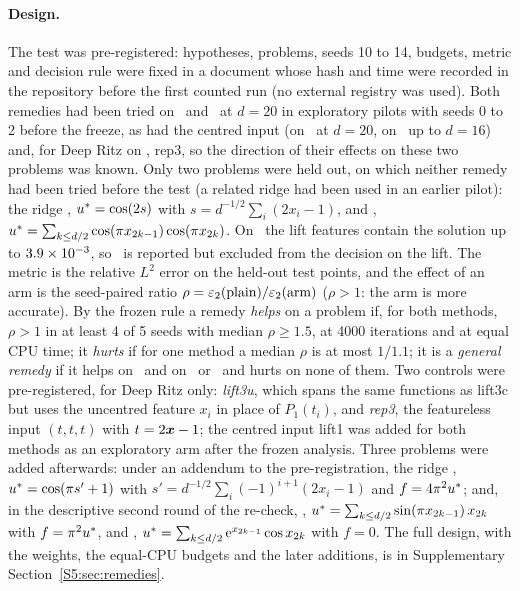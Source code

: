 \paragraph{Design.} The test was pre-registered: hypotheses, problems, seeds 10 to 14, budgets,
metric and decision rule were fixed in a document whose hash and time were recorded in the
repository before the first counted run (no external registry was used). Both remedies had been
tried on \Pone\ and \Ptwo\ at $d=20$ in exploratory pilots with seeds 0 to 2 before the freeze, as
had the centred input (on \Pone\ at $d=20$, on \Ptwo\ up to $d=16$) and, for Deep Ritz on \Pone,
rep3, so the direction of their effects on these two problems was known. Only two problems were
held out, on which neither remedy had been tried before the test (a related ridge had been used in
an earlier pilot): the ridge \Pridge, $u^{*}=\cos(2s)$ with $s=d^{-1/2}\sum_i(2x_i-1)$, and
\Pcospair, $u^{*}=\sum_{k\le d/2}\cos(\pi x_{2k-1})\cos(\pi x_{2k})$. On \Ptwo\ the lift features
contain the solution up to $3.9\times 10^{-3}$, so \Ptwo\ is reported but excluded from the decision on
the lift. The metric is the relative $L^2$ error on the held-out test points, and the effect of an
arm is the seed-paired ratio $\rho=\varepsilon_{2}(\text{plain})/\varepsilon_{2}(\text{arm})$ ($\rho>1$: the arm is
more accurate). By the frozen rule a remedy \emph{helps} on a problem if, for both methods,
$\rho>1$ in at least 4 of 5 seeds with median $\rho\ge1.5$, at 4000 iterations and at equal CPU
time; it \emph{hurts} if for one method a median $\rho$ is at most $1/1.1$; it is a \emph{general
remedy} if it helps on \Pone\ and on \Pridge\ or \Pcospair\ and hurts on none of them. Two controls
were pre-registered, for Deep Ritz only: \emph{lift3u}, which spans the same functions as lift3c
but uses the uncentred feature $x_i$ in place of $P_1(t_i)$, and \emph{rep3}, the featureless input
$(t,t,t)$ with $t=2\boldsymbol{x}-1$; the centred input lift1 was added for both methods as an exploratory arm
after the frozen analysis. Three problems were added afterwards: under an addendum to the
pre-registration, the ridge \Paltridge, $u^{*}=\cos(\pi s'+1)$ with
$s'=d^{-1/2}\sum_i(-1)^{i+1}(2x_i-1)$ and $f=4\pi^2u^{*}$; and, in the descriptive second round of
the re-check, \Psinlin, $u^{*}=\sum_{k\le d/2}\sin(\pi x_{2k-1})\,x_{2k}$ with $f=\pi^2u^{*}$, and
\Pexpcos, $u^{*}=\sum_{k\le d/2}\mathrm{e}^{x_{2k-1}}\cos x_{2k}$ with $f=0$. The full design, with the
weights, the equal-CPU budgets and the later additions, is in Supplementary
Section~\ref{S5:sec:remedies}.

